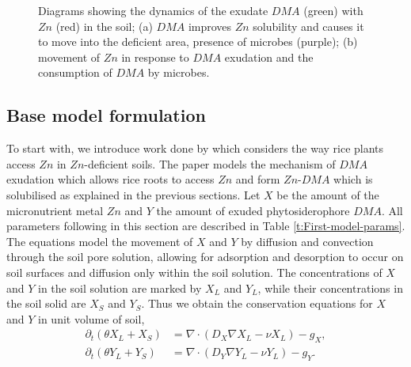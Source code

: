 \documentclass[11pt]{article}
\numberwithin{equation}{section}
\begin{document}
\begin{figure}[h]
\begin{subfigure}[t]{0.4\textwidth}
    \caption{
    }
    \label{fig:my_label}
\end{subfigure}
\caption{Diagrams showing the dynamics of the exudate $DMA$ (green) with $Zn$ (red) in the soil; (a) $DMA$ improves $Zn$ solubility and causes it to move into the deficient area, presence of microbes (purple); (b) movement of $Zn$ in response to $DMA$ exudation and the consumption of $DMA$ by microbes.}
\end{figure}


\subsection{Base model formulation}
\label{sec:bio_basemodel}
To start with, we introduce work done by \cite{Ptashnyk-2011} which considers the way rice plants access $Zn$ in $Zn$-deficient soils. The paper models the mechanism of $DMA$ exudation which allows rice roots to access $Zn$ and form $Zn$-$DMA$ which is solubilised as explained in the previous sections. Let $X$ be the amount of the micronutrient metal $Zn$ and $Y$ the amount of exuded phytosiderophore $DMA$. All parameters following in this section are described in Table \ref{t:First-model-params}. 
The equations model the movement of $X$ and $Y$ by diffusion and convection through the soil pore solution, allowing for adsorption and desorption to occur on soil surfaces and diffusion only within the soil solution. 
The concentrations of $X$ and $Y$ in the soil solution are marked by $X_L$ and $Y_L$, while their concentrations in the soil solid are $X_S$ and $Y_S$.
Thus we obtain the conservation equations for $X$ and $Y$ in unit volume of soil,
\begin{equation}
    \begin{aligned}
        \partial_t(\theta X_L+X_S)&=\nabla \cdot (D_X\nabla X_L-\nu X_L)-g_X,\\
        \partial_t(\theta Y_L+Y_S)&=\nabla \cdot (D_Y\nabla Y_L-\nu Y_L)-g_Y.\\
    \end{aligned}
    \label{eq:1}
\end{equation}
\end{document}
